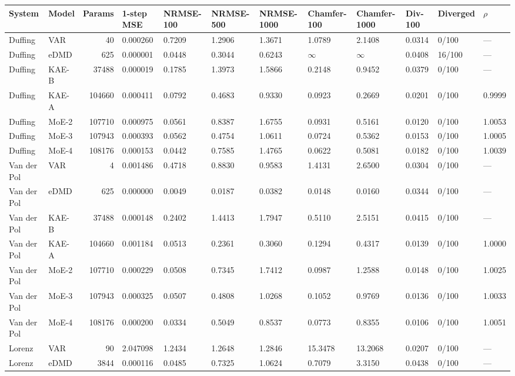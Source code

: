 \begin{tabular}{llrlllllllll}
\toprule
System & Model & Params & 1-step MSE & NRMSE-100 & NRMSE-500 & NRMSE-1000 & Chamfer-100 & Chamfer-1000 & Div-100 & Diverged & $\rho$ \\
\midrule
Duffing & VAR & 40 & 0.000260 & 0.7209 & 1.2906 & 1.3671 & 1.0789 & 2.1408 & 0.0314 & 0/100 & --- \\
Duffing & eDMD & 625 & 0.000001 & 0.0448 & 0.3044 & 0.6243 & $\infty$ & $\infty$ & 0.0408 & 16/100 & --- \\
Duffing & KAE-B & 37488 & 0.000019 & 0.1785 & 1.3973 & 1.5866 & 0.2148 & 0.9452 & 0.0379 & 0/100 & --- \\
Duffing & KAE-A & 104660 & 0.000411 & 0.0792 & 0.4683 & 0.9330 & 0.0923 & 0.2669 & 0.0201 & 0/100 & 0.9999 \\
Duffing & MoE-2 & 107710 & 0.000975 & 0.0561 & 0.8387 & 1.6755 & 0.0931 & 0.5161 & 0.0120 & 0/100 & 1.0053 \\
Duffing & MoE-3 & 107943 & 0.000393 & 0.0562 & 0.4754 & 1.0611 & 0.0724 & 0.5362 & 0.0153 & 0/100 & 1.0005 \\
Duffing & MoE-4 & 108176 & 0.000153 & 0.0442 & 0.7585 & 1.4765 & 0.0622 & 0.5081 & 0.0182 & 0/100 & 1.0039 \\
Van der Pol & VAR & 4 & 0.001486 & 0.4718 & 0.8830 & 0.9583 & 1.4131 & 2.6500 & 0.0304 & 0/100 & --- \\
Van der Pol & eDMD & 625 & 0.000000 & 0.0049 & 0.0187 & 0.0382 & 0.0148 & 0.0160 & 0.0344 & 0/100 & --- \\
Van der Pol & KAE-B & 37488 & 0.000148 & 0.2402 & 1.4413 & 1.7947 & 0.5110 & 2.5151 & 0.0415 & 0/100 & --- \\
Van der Pol & KAE-A & 104660 & 0.001184 & 0.0513 & 0.2361 & 0.3060 & 0.1294 & 0.4317 & 0.0139 & 0/100 & 1.0000 \\
Van der Pol & MoE-2 & 107710 & 0.000229 & 0.0508 & 0.7345 & 1.7412 & 0.0987 & 1.2588 & 0.0148 & 0/100 & 1.0025 \\
Van der Pol & MoE-3 & 107943 & 0.000325 & 0.0507 & 0.4808 & 1.0268 & 0.1052 & 0.9769 & 0.0136 & 0/100 & 1.0033 \\
Van der Pol & MoE-4 & 108176 & 0.000200 & 0.0334 & 0.5049 & 0.8537 & 0.0773 & 0.8355 & 0.0106 & 0/100 & 1.0051 \\
Lorenz & VAR & 90 & 2.047098 & 1.2434 & 1.2648 & 1.2846 & 15.3478 & 13.2068 & 0.0207 & 0/100 & --- \\
Lorenz & eDMD & 3844 & 0.000116 & 0.0485 & 0.7325 & 1.0624 & 0.7079 & 3.3150 & 0.0438 & 0/100 & --- \\

\end{tabular}

